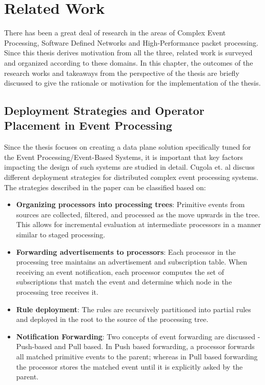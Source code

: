 \chapter{Related Work}
There has been a great deal of research in the areas of Complex Event Processing, Software Defined Networks and High-Performance packet processing. Since this thesis derives motivation from all the three, related work is surveyed and organized according to these domains. In this chapter, the outcomes of the research works and takeaways from the perspective of the thesis are briefly discussed to give the rationale or motivation for the implementation of the thesis.

\section{Deployment Strategies and Operator Placement in Event Processing}
Since the thesis focuses on creating a data plane solution specifically tuned for the Event Processing/Event-Based Systems, it is important that key factors impacting the design of such systems are studied in detail.
Cugola et. al \cite{Cugola} discuss different deployment strategies for distributed complex event processing systems. The strategies described in the paper can be classified based on:
\begin{itemize}
 \item \textbf{Organizing processors into processing trees}: Primitive events from sources are collected, filtered, and processed as the move upwards in the tree. This allows for incremental evaluation at intermediate processors in a manner similar to staged processing. 
 \item \textbf{Forwarding advertisements to processors}: Each processor in the processing tree maintains an advertisement and subscription table.  When receiving an event notification, each processor computes the set of subscriptions that match the event and determine which node in the processing tree receives it. 
 \item \textbf{Rule deployment}: The rules are recursively partitioned into partial rules and deployed in the root to the source of the processing tree. 
 \item \textbf{Notification Forwarding}: Two concepts of event forwarding are discussed - Push-based and Pull based. In Push based forwarding, a processor forwards all matched primitive events to the parent; whereas in Pull based forwarding the processor stores the matched event until it is explicitly asked by the parent. 
\end{itemize}
